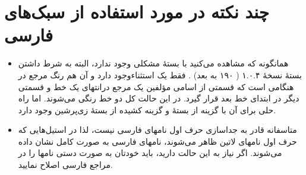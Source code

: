 \documentclass{article}
\theoremstyle{plain}\newtheorem{question}{پرسش}
\begin{document}
\section{چند نکته در مورد استفاده از سبک‌های فارسی}
\begin{itemize}
\item همانگونه که مشاهده می‌کنید با بستهٔ  مشکلی وجود ندارد، البته به شرط داشتن بستهٔ نسخهٔ ۱.۰.۴ ( ۱۹۰ به بعد) . فقط یک استثناءوجود دارد و آن هم رنگ مرجع در هنگامی است که  قسمتی از اسامی مؤلفین یک مرجع درانتهای یک خط و قسمتی دیگر در ابتدای خط بعد قرار گیرد. در این حالت کل دو خط رنگی می‌شوند. اما راه حلی برای آن با  گزینه   از بستهٔ  و گزینه  کشیده  از بستهٔ زی‌پرشین وجود دارد.


\item متاسفانه  قادر به جداسازی حرف اول نامهای فارسی نیست، لذا در استیل‌‌هایی که حرف اول نامهای لاتین ظاهر می‌شوند، نامهای فارسی به صورت کامل نشان داده می‌شوند. اگر نیاز به این حالت دارید، باید خودتان به صورت دستی نامها را در مراجع فارسی اصلاح نمایید.


\end{itemize}
\end{document}
